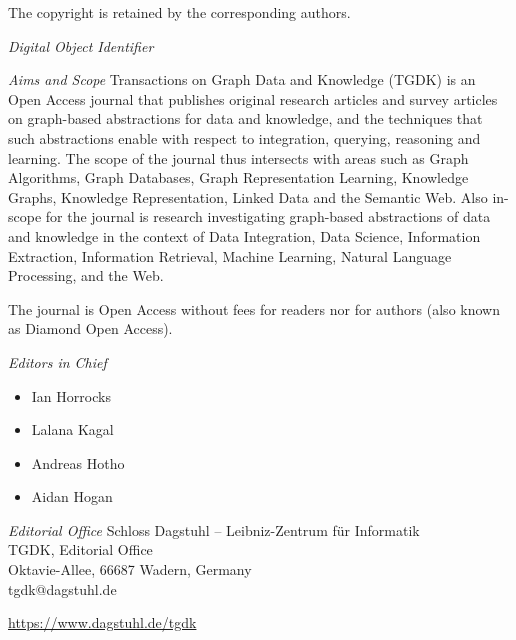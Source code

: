 \documentclass[a4paper,UKenglish]{tgdkmaster-v2021}
\begin{document}
\begin{publicationinfo}
The copyright is retained by the corresponding authors.

\vfill
\emph{Digital Object Identifier}\newline
\printForewordDOI

\newpage


\bigskip

\emph{Aims and Scope}\newline
Transactions on Graph Data and Knowledge (TGDK) is an Open Access journal that publishes original research articles and survey articles on graph-based abstractions for data and knowledge, and the techniques that such abstractions enable with respect to integration, querying, reasoning and learning. The scope of the journal thus intersects with areas such as Graph Algorithms, Graph Databases, Graph Representation Learning, Knowledge Graphs, Knowledge Representation, Linked Data and the Semantic Web. Also in-scope for the journal is research investigating graph-based abstractions of data and knowledge in the context of Data Integration, Data Science, Information Extraction, Information Retrieval, Machine Learning, Natural Language Processing, and the Web.

\medskip

The journal is Open Access without fees for readers nor for authors (also known as Diamond Open Access).	

\bigskip

\emph{Editors in Chief}
\begin{itemize}
\item Ian Horrocks %
\item Lalana Kagal %
\item Andreas Hotho %
\item Aidan Hogan %
\end{itemize}

\bigskip
\emph{Editorial Office}\newline
Schloss Dagstuhl -- Leibniz-Zentrum f\"ur Informatik\\
TGDK, Editorial Office\\
Oktavie-Allee, 66687 Wadern, Germany\\ 
tgdk@dagstuhl.de


\vfill

\url{https://www.dagstuhl.de/tgdk}
 
 \thispagestyle{empty}
 \onecolumn
\end{publicationinfo}
\end{document}
